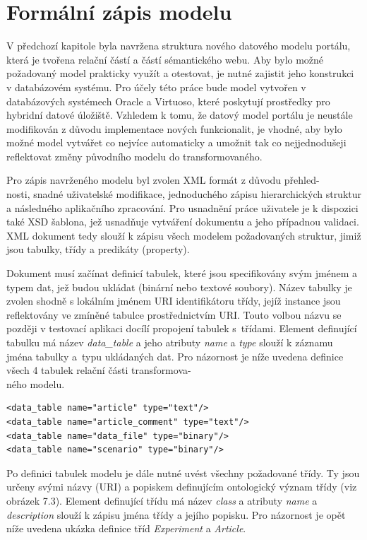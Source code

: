 \documentclass{projekt}
\begin{document}
\section{Formální zápis modelu}
\hspace{0.65cm}V předchozí kapitole byla navržena struktura nového datového modelu portálu, která je tvořena relační částí a částí sémantického webu. Aby bylo možné požadovaný model prakticky využít a otestovat, je nutné zajistit jeho konstrukci v databázovém systému. Pro účely této práce bude model vytvořen v databázových systémech Oracle a Virtuoso, které poskytují prostředky pro hybridní datové úložiště. Vzhledem k tomu, že datový model portálu je neustále modifikován z důvodu implementace nových funkcionalit, je vhodné, aby bylo možné model vytvářet co nejvíce automaticky a umožnit tak co nejjednodušeji reflektovat změny původního modelu do transformovaného.

Pro zápis navrženého modelu byl zvolen XML formát z důvodu přehled-\\nosti, snadné uživatelské modifikace, jednoduchého zápisu hierarchických struktur a následného aplikačního zpracování. Pro usnadnění práce uživatele je k dispozici také XSD šablona, jež usnadňuje vytváření dokumentu a jeho případnou validaci. XML dokument tedy slouží k zápisu všech modelem požadovaných struktur, jimiž jsou tabulky, třídy a predikáty (property).

Dokument musí začínat definicí tabulek, které jsou specifikovány svým jménem a typem dat, jež budou ukládat (binární nebo textové soubory). Název tabulky je zvolen shodně s lokálním jménem URI identifikátoru třídy, jejíž instance jsou reflektovány ve zmíněné tabulce prostřednictvím URI. Touto volbou názvu se později v testovací aplikaci docílí propojení tabulek s~třídami. Element definující tabulku má název {\it data\_table} a jeho atributy {\it name} a {\it type} slouží k záznamu jména tabulky a~typu ukládaných dat. Pro názornost je níže uvedena definice všech 4 tabulek relační části transformova-\\ného modelu.

\begin{verbatim}
<data_table name="article" type="text"/>
<data_table name="article_comment" type="text"/>
<data_table name="data_file" type="binary"/>
<data_table name="scenario" type="binary"/>
\end{verbatim}

Po definici tabulek modelu je dále nutné uvést všechny požadované třídy. Ty jsou určeny svými názvy (URI) a popiskem definujícím ontologický význam třídy (viz obrázek 7.3).
Element definující třídu má název {\it class} a atributy {\it name} a {\it description} slouží k zápisu jména třídy a jejího popisku. Pro názornost je opět níže uvedena ukázka definice tříd {\it Experiment} a {\it Article}.
\end{document}
